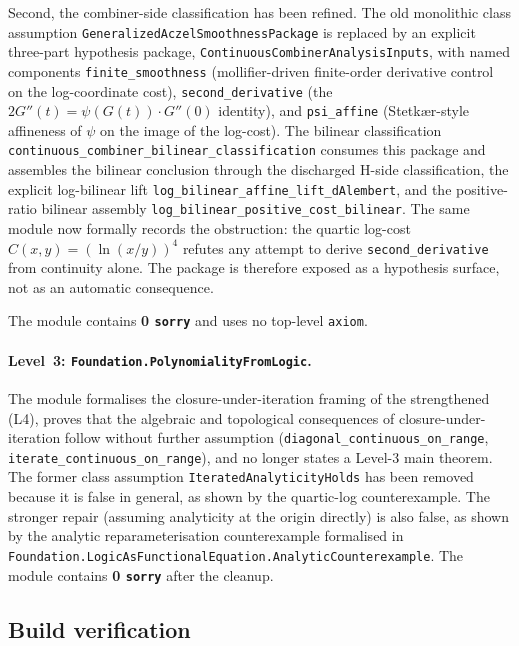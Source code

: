 \documentclass[11pt,a4paper]{article}
\theoremstyle{definition}
\theoremstyle{remark}
\begin{document}
Second, the combiner-side classification has been refined. The old
monolithic class assumption \texttt{GeneralizedAczelSmoothnessPackage}
is replaced by an explicit three-part hypothesis package,
\texttt{ContinuousCombinerAnalysisInputs}, with named components
\texttt{finite\_smoothness} (mollifier-driven finite-order derivative
control on the log-coordinate cost),
\texttt{second\_derivative} (the
$2 G''(t) = \psi(G(t)) \cdot G''(0)$ identity), and
\texttt{psi\_affine} (Stetk{\ae}r-style affineness of $\psi$ on the
image of the log-cost). The bilinear classification
\texttt{continuous\_combiner\_bilinear\_classification} consumes this
package and assembles the bilinear conclusion through the discharged
H-side classification, the explicit log-bilinear lift
\texttt{log\_bilinear\_affine\_lift\_dAlembert}, and the
positive-ratio bilinear assembly
\texttt{log\_bilinear\_positive\_cost\_bilinear}. The same module now
formally records the obstruction: the quartic log-cost
$C(x, y) = (\ln(x/y))^4$ refutes any attempt to derive
\texttt{second\_derivative} from continuity alone. The package is
therefore exposed as a hypothesis surface, not as an automatic
consequence.

The module contains \textbf{0 \texttt{sorry}} and uses no top-level
\texttt{axiom}.

\paragraph{Level~3: \texttt{Foundation.PolynomialityFromLogic}.}
The module formalises the closure-under-iteration framing of the
strengthened (L4), proves that the algebraic and topological
consequences of closure-under-iteration follow without further
assumption (\texttt{diagonal\_continuous\_on\_range},
\texttt{iterate\_continuous\_on\_range}), and no longer states a
Level-3 main theorem. The former class assumption
\texttt{IteratedAnalyticityHolds} has been removed because it is false
in general, as shown by the quartic-log counterexample. The stronger
repair (assuming analyticity at the origin directly) is also false, as
shown by the analytic reparameterisation counterexample formalised in
\texttt{Foundation.LogicAsFunctionalEquation.AnalyticCounterexample}.
The module contains \textbf{0 \texttt{sorry}} after the cleanup.

\subsection{Build verification}\label{app:build}
\end{document}
